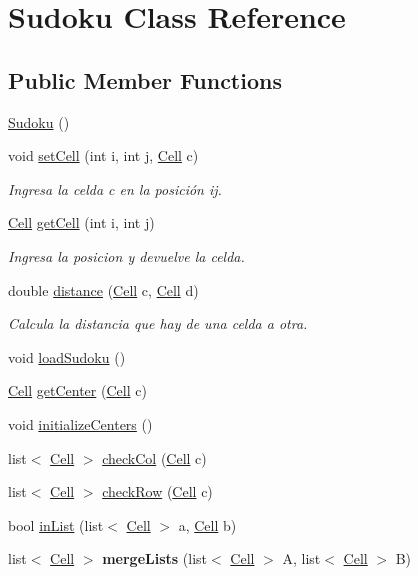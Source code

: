 \hypertarget{class_sudoku}{\section{Sudoku Class Reference}
\label{class_sudoku}
}
\subsection*{Public Member Functions}
\begin{DoxyCompactItemize}
\item 
\hyperlink{class_sudoku_a5fc6547fe577e8eca24a7e86d2fa0ff8}{Sudoku} ()
\item 
void \hyperlink{class_sudoku_adc8056faf07d87de883a158b725e6147}{set\-Cell} (int i, int j, \hyperlink{class_cell}{Cell} c)
\begin{DoxyCompactList}\small\item\em Ingresa la celda c en la posición ij. \end{DoxyCompactList}\item 
\hyperlink{class_cell}{Cell} \hyperlink{class_sudoku_aedf7e9b2aff39c2c7780f3d86d2cce4a}{get\-Cell} (int i, int j)
\begin{DoxyCompactList}\small\item\em Ingresa la posicion y devuelve la celda. \end{DoxyCompactList}\item 
double \hyperlink{class_sudoku_abd9fe1e98fac81bcc091efad36471aee}{distance} (\hyperlink{class_cell}{Cell} c, \hyperlink{class_cell}{Cell} d)
\begin{DoxyCompactList}\small\item\em Calcula la distancia que hay de una celda a otra. \end{DoxyCompactList}\item 
void \hyperlink{class_sudoku_a924e2ea0f124bf62dab548fbc3874306}{load\-Sudoku} ()
\item 
\hyperlink{class_cell}{Cell} \hyperlink{class_sudoku_ae93e04817312534e48406d7fc5c56613}{get\-Center} (\hyperlink{class_cell}{Cell} c)
\item 
void \hyperlink{class_sudoku_a0929ca2fcbf280b6a769917791ca8406}{initialize\-Centers} ()
\item 
list$<$ \hyperlink{class_cell}{Cell} $>$ \hyperlink{class_sudoku_af8ca2a52ac9f9385aa581e188600d313}{check\-Col} (\hyperlink{class_cell}{Cell} c)
\item 
list$<$ \hyperlink{class_cell}{Cell} $>$ \hyperlink{class_sudoku_a827821ce9fdcacfe62f3986cd9be9db1}{check\-Row} (\hyperlink{class_cell}{Cell} c)
\item 
bool \hyperlink{class_sudoku_a057dd2f4b6987c0d13a230ed9ea3a347}{in\-List} (list$<$ \hyperlink{class_cell}{Cell} $>$ a, \hyperlink{class_cell}{Cell} b)
\item 
\hypertarget{class_sudoku_a2577a9930026b4b3ab85fe72175fb5e0}{list$<$ \hyperlink{class_cell}{Cell} $>$ {\bfseries merge\-Lists} (list$<$ \hyperlink{class_cell}{Cell} $>$ A, list$<$ \hyperlink{class_cell}{Cell} $>$ B)}\label{class_sudoku_a2577a9930026b4b3ab85fe72175fb5e0}


\end{DoxyCompactItemize}
